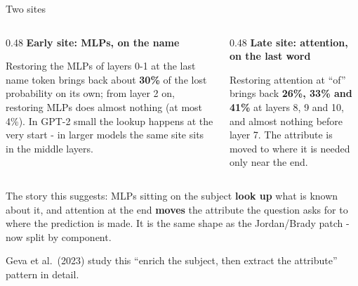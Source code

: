 \documentclass[aspectratio=169]{beamer}
\newcommand{\keybox}[1]{%
  \begin{tcolorbox}[colback=armblue!8, colframe=armblue, boxrule=0.6pt, arc=2pt]
  #1
  \end{tcolorbox}}
\begin{document}
\begin{frame}{Two sites}
  \vspace{0.4em}
  \begin{columns}[T]
    \begin{column}{0.48\textwidth}
      \textbf{Early site: MLPs, on the name}

      \vspace{0.3em}
      {\small Restoring the MLPs of layers 0-1 at the last name token brings back about \textbf{30\%} of the lost probability on its own; from layer 2 on, restoring MLPs does almost nothing (at most 4\%). In GPT-2 small the lookup happens at the very start - in larger models the same site sits in the middle layers.}
    \end{column}
    \begin{column}{0.48\textwidth}
      \textbf{Late site: attention, on the last word}

      \vspace{0.3em}
      {\small Restoring attention at ``of'' brings back \textbf{26\%, 33\% and 41\%} at layers 8, 9 and 10, and almost nothing before layer 7. The attribute is moved to where it is needed only near the end.}
    \end{column}
  \end{columns}

  \vspace{0.8em}
  \keybox{\small The story this suggests: MLPs sitting on the subject \textbf{look up} what is
  known about it, and attention at the end \textbf{moves} the attribute the question asks for to
  where the prediction is made. It is the same shape as the Jordan/Brady patch - now split by
  component.}

  \vspace{0.3em}
  {\footnotesize Geva et al.\ (2023) study this ``enrich the subject, then extract the attribute''
  pattern in detail.}
\end{frame}
\end{document}
